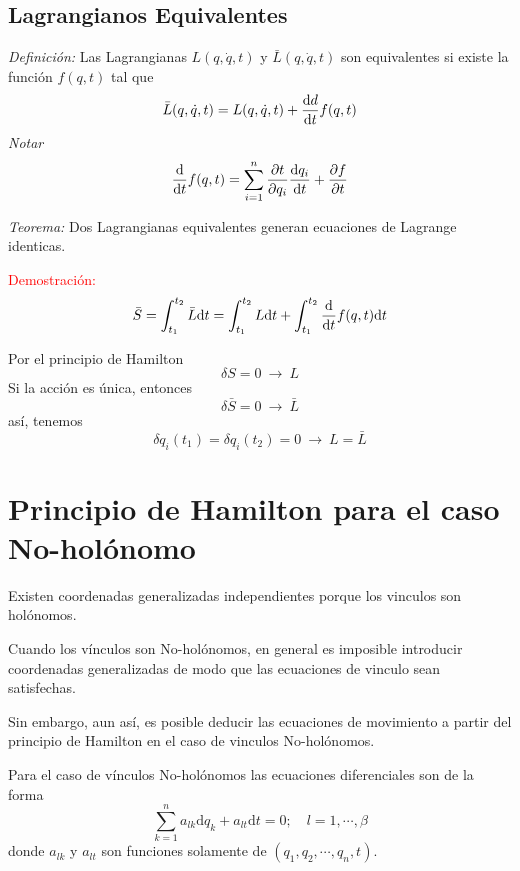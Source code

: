 \documentclass[../main]{subfiles}
\begin{document}
\subsection{Lagrangianos Equivalentes}
\textit{Definición:} Las Lagrangianas $L(q, \dot{q}, t)$ y $\bar{L}(q, \dot{q}, t)$ son equivalentes si existe la función $f(q,t)$ tal que
\begin{equation}
    \bar{L}(q, \dot{q}, t)=L(q, \dot{q}, t)+\dv{d}{t}f(q,t)
\end{equation}
\textit{Notar}
\begin{equation}
    \dv{}{t}f(q, t)=\sum_{i=1}^n \pdv{t}{q_i}\dv{q_i}{t}+\pdv{f}{t}
\end{equation}

\textit{Teorema:} Dos Lagrangianas equivalentes generan ecuaciones de Lagrange identicas.

\textcolor{red}{Demostración:}
\begin{equation}
    \bar{S}=\int_{t_1}^{t_2} \bar{L}\mathrm{d}t=\int_{t_1}^{t_2}L\mathrm{d}t+\int_{t_1}^{t_2}\dv{}{t}f(q, t)\mathrm{d}t
\end{equation}

Por el principio de Hamilton
\begin{equation}
    \delta S=0 \ \rightarrow \ L
\end{equation}
Si la acción es única, entonces
\begin{equation}
    \delta \bar{S}=0 \ \rightarrow \ \bar{L}
\end{equation}
así, tenemos
\begin{equation}
    \delta q_i (t_1) =\delta q_i (t_2) =0 \ \rightarrow \ L=\bar{L}
\end{equation}

\section{Principio de Hamilton para el caso No-holónomo}
Existen coordenadas generalizadas independientes porque los vinculos son holónomos.

Cuando los vínculos son No-holónomos, en general es imposible introducir coordenadas generalizadas de modo que las ecuaciones de vinculo sean satisfechas.

Sin embargo, aun así, es posible deducir las ecuaciones de movimiento a partir del principio de Hamilton en el caso de vinculos No-holónomos.

Para el caso de vínculos No-holónomos las ecuaciones diferenciales son de la forma
\begin{equation}
    \sum_{k=1}^n a_{lk}\mathrm{d}q_k+a_{lt}\mathrm{d}t=0; \quad l=1, \cdots, \beta
\end{equation}
donde $a_{lk}$ y $a_{lt}$ son funciones solamente de $(q_1, q_2, \cdots, q_n, t)$.
\end{document}
